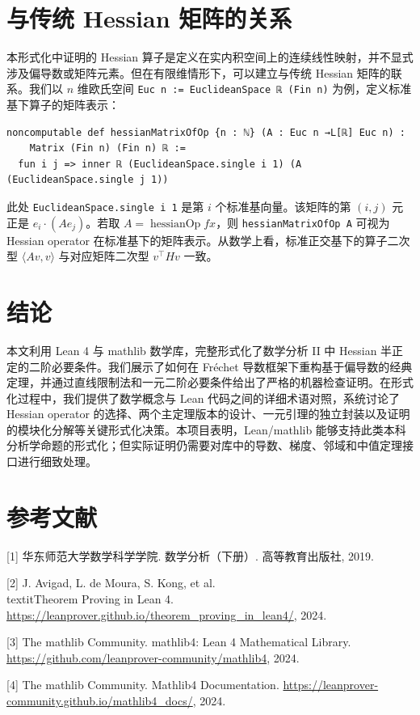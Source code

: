 ﻿\documentclass[UTF8,a4paper,zihao=-4]{ctexart}
\begin{document}
\section{与传统 Hessian 矩阵的关系}
本形式化中证明的 Hessian 算子是定义在实内积空间上的连续线性映射，并不显式涉及偏导数或矩阵元素。但在有限维情形下，可以建立与传统 Hessian 矩阵的联系。我们以 \(n\) 维欧氏空间 \texttt{Euc n := EuclideanSpace ℝ (Fin n)} 为例，定义标准基下算子的矩阵表示：
\begin{verbatim}
noncomputable def hessianMatrixOfOp {n : ℕ} (A : Euc n →L[ℝ] Euc n) :
    Matrix (Fin n) (Fin n) ℝ :=
  fun i j => inner ℝ (EuclideanSpace.single i 1) (A (EuclideanSpace.single j 1))
\end{verbatim}
此处 \texttt{EuclideanSpace.single i 1} 是第 \(i\) 个标准基向量。该矩阵的第 \((i,j)\) 元正是 \(e_i \cdot (A e_j)\)。若取 \(A = \operatorname{hessianOp} f x\)，则 \texttt{hessianMatrixOfOp A} 可视为 Hessian operator 在标准基下的矩阵表示。从数学上看，标准正交基下的算子二次型 \(\langle Av,v\rangle\) 与对应矩阵二次型 \(v^{\top}Hv\) 一致。

\section{结论}
本文利用 Lean 4 与 mathlib 数学库，完整形式化了数学分析 II 中 Hessian 半正定的二阶必要条件。我们展示了如何在 Fréchet 导数框架下重构基于偏导数的经典定理，并通过直线限制法和一元二阶必要条件给出了严格的机器检查证明。在形式化过程中，我们提供了数学概念与 Lean 代码之间的详细术语对照，系统讨论了 Hessian operator 的选择、两个主定理版本的设计、一元引理的独立封装以及证明的模块化分解等关键形式化决策。本项目表明，Lean/mathlib 能够支持此类本科分析学命题的形式化；但实际证明仍需要对库中的导数、梯度、邻域和中值定理接口进行细致处理。

\section*{参考文献}
[1] 华东师范大学数学科学学院. 数学分析（下册）. 高等教育出版社, 2019.

[2] J. Avigad, L. de Moura, S. Kong, et al. \\textit{Theorem Proving in Lean 4}. \url{https://leanprover.github.io/theorem_proving_in_lean4/}, 2024.

[3] The mathlib Community. mathlib4: Lean 4 Mathematical Library. \url{https://github.com/leanprover-community/mathlib4}, 2024.

[4] The mathlib Community. Mathlib4 Documentation. \url{https://leanprover-community.github.io/mathlib4_docs/}, 2024.
\end{document}
